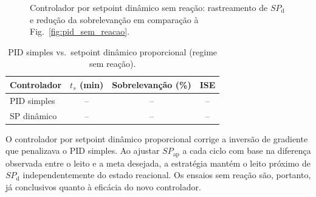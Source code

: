 \begin{figure}[ht]
\begin{center}
\fbox{\parbox{7.5cm}{\centering\vspace{1.5cm}
{\small [FIGURA A INSERIR]\\[4pt]
Setpoint dinâmico, sem reação:\\temperaturas da camisa e do leito vs.\ tempo}\vspace{1.5cm}}}
\caption{Controlador por setpoint dinâmico sem reação: rastreamento de
$SP_{\mathrm{d}}$ e redução da sobrelevanção em comparação à
Fig.~\ref{fig:pid_sem_reacao}.}
\label{fig:novo_ctrl_sem_reacao}
\end{center}
\end{figure}

\begin{table}[ht]
\begin{center}
\caption{PID simples vs.\ setpoint dinâmico proporcional (regime sem reação).}
\label{tab:metricas_novo}
\begin{tabular}{lccc}
\hline
Controlador & $t_s$ (min) & Sobrelevanção (\%) & ISE \\
\hline
PID simples & -- & -- & -- \\
SP dinâmico & -- & -- & -- \\
\hline
\end{tabular}
\end{center}
\end{table}

O controlador por setpoint dinâmico proporcional corrige a inversão de
gradiente que penalizava o PID simples. Ao ajustar $SP_{\mathrm{ap}}$ a cada
ciclo com base na diferença observada entre o leito e a meta desejada, a
estratégia mantém o leito próximo de $SP_{\mathrm{d}}$ independentemente
do estado reacional. Os ensaios sem reação são, portanto, já conclusivos
quanto à eficácia do novo controlador.

